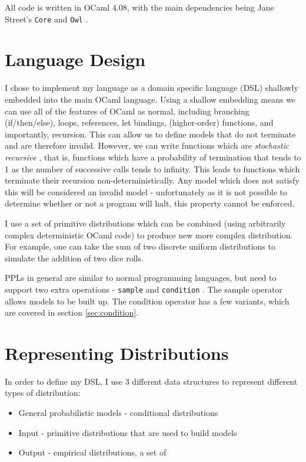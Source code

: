 All code is written in OCaml 4.08, with the main dependencies being Jane Street's \texttt{Core} and \texttt{Owl} \cite{owl}.	
	
\section{Language Design}
I chose to implement my language as a domain specific language (DSL) shallowly embedded into the main OCaml language. Using a shallow embedding means we can use all of the features of OCaml as normal, including branching (if/then/else), loops, references, let bindings, (higher-order) functions, and importantly, recursion. This can allow us to define models that do not terminate and are therefore invalid. However, we can write functions which are \textit{stochastic recursive} \cite{siegmund}, that is, functions which have a probability of termination that tends to 1 as the number of successive calls tends to infinity. This leads to functions which terminate their recursion non-deterministically. Any model which does not satisfy this will be considered an invalid model - unfortunately as it is not possible to determine whether or not a program will halt, this property cannot be enforced. 
	
I use a set of primitive distributions which can be combined (using arbitrarily complex deterministic OCaml code) to produce new more complex distribution. For example, one can take the sum of two discrete uniform distributions to simulate the addition of two dice rolls. 
	
PPLs in general are similar to normal programming languages, but need to support two extra operations - \texttt{sample} and \texttt{condition} \cite{gordon2014probabilistic}. The sample operator allows models to be built up. The condition operator has a few variants, which are covered in section \ref{sec:condition}.
	
\section{Representing Distributions}
In order to define my DSL, I use 3 different data structures to represent different types of distribution:
\begin{itemize}
	\item General probabilistic models - conditional distributions
	\item Input - primitive distributions that are used to build models
	\item Output - empirical distributions, a set of 
\end{itemize}
	
